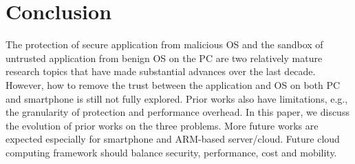 \section{Conclusion}
\label{sec:conclusion}

The protection of secure application from malicious OS and the sandbox of
untrusted application from benign OS on the PC are two relatively mature
research topics that have made substantial advances over the last decade.
However, how to remove the trust between the application and OS on both PC and
smartphone is still not fully explored.  Prior works also have limitations,
e.g., the granularity of protection and performance overhead. In this paper, we
discuss the evolution of prior works on the three problems.  More future works
are expected especially for smartphone and ARM-based server/cloud. Future cloud
computing framework should balance security, performance, cost and mobility.
